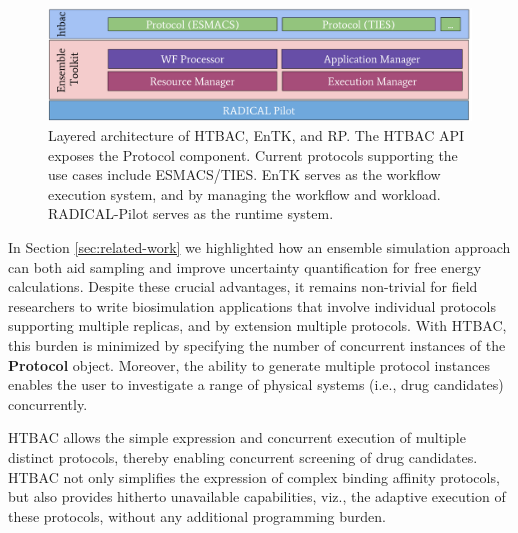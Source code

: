 \begin{figure}
  \centering
   \includegraphics[width=\columnwidth]{figures/isc_htbac_integration_with_entk_RP-4.pdf}
  \caption{Layered architecture of HTBAC, EnTK, and RP. The HTBAC API exposes the Protocol
  component. Current protocols supporting the use cases include ESMACS/TIES.  
  EnTK serves as the workflow execution system, and by managing the workflow and workload. 
  RADICAL-Pilot serves as the runtime system.}
\label{fig:integration}
\end{figure}



In Section \ref{sec:related-work} we highlighted how an ensemble
simulation approach can both aid sampling and improve uncertainty
quantification for free energy calculations. Despite these crucial advantages,
it remains non-trivial for field researchers to write biosimulation
applications that involve individual protocols supporting multiple replicas,
and by extension multiple protocols. With HTBAC, this burden is minimized by
specifying the number of concurrent instances of the \textbf{Protocol} object.
Moreover, the ability to generate multiple protocol instances enables the user
to investigate a range of physical systems (i.e., drug candidates)
concurrently.

HTBAC allows the simple expression and concurrent execution of multiple
distinct protocols, thereby enabling concurrent screening of drug candidates.
HTBAC not only simplifies the expression of complex binding affinity
protocols, but also provides hitherto unavailable capabilities, viz., the
adaptive execution of these protocols, without any additional programming
burden. 



